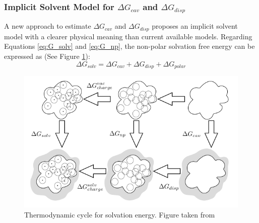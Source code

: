 \subsubsection{Implicit Solvent Model for $\Delta G_{cav}$ and $\Delta G_{disp}$}
A new approach to estimate $\Delta G_{cav}$ and $\Delta G_{disp}$ \cite{} proposes an implicit solvent model with a clearer physical meaning than current available models. Regarding Equations \ref{eq:G_solv} and \ref{eq:G_np}, the non-polar solvation free energy can be expressed as (See Figure \ref{fig:np_cycle}): 
\begin{equation}
    \Delta G_{solv}= \Delta G_{cav}+ \Delta G_{disp}+ \Delta G_{polar}
\end{equation}
\begin{figure}[h]
    \centering
    \includegraphics[scale=0.6]{Figures/Chapter 4/np_cycle.png}
    \caption{Thermodynamic cycle for solvation energy. Figure taken from \cite{cooper2020simple}}
    \label{fig:np_cycle}
\end{figure}

